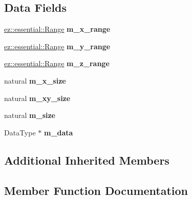 \subsection*{Data Fields}
\begin{DoxyCompactItemize}
\item 
\mbox{\label{classez_1_1objects_1_1Matrix3D_a0544904c21295ea452d0e0180db3e41f}} 
\hyperlink{classez_1_1essential_1_1Range}{ez\+::essential\+::\+Range} {\bfseries m\+\_\+x\+\_\+range}
\item 
\mbox{\label{classez_1_1objects_1_1Matrix3D_add280dfed8a17e70a78d34caea7e9cf2}} 
\hyperlink{classez_1_1essential_1_1Range}{ez\+::essential\+::\+Range} {\bfseries m\+\_\+y\+\_\+range}
\item 
\mbox{\label{classez_1_1objects_1_1Matrix3D_a06da3c5d6d3f37b7edb5958cce62f679}} 
\hyperlink{classez_1_1essential_1_1Range}{ez\+::essential\+::\+Range} {\bfseries m\+\_\+z\+\_\+range}
\item 
\mbox{\label{classez_1_1objects_1_1Matrix3D_a58ae013adbf48027f42590ecdb668b60}} 
natural {\bfseries m\+\_\+x\+\_\+size}
\item 
\mbox{\label{classez_1_1objects_1_1Matrix3D_a529b9fe5dad9cf31f0a3a2169f194247}} 
natural {\bfseries m\+\_\+xy\+\_\+size}
\item 
\mbox{\label{classez_1_1objects_1_1Matrix3D_a03de23a09ae91fcdc5b65408d280e3c9}} 
natural {\bfseries m\+\_\+size}
\item 
\mbox{\label{classez_1_1objects_1_1Matrix3D_a292ada7dbe95708f68c757cdf36a5a56}} 
Data\+Type $\ast$ {\bfseries m\+\_\+data}
\end{DoxyCompactItemize}
\subsection*{Additional Inherited Members}


\subsection{Member Function Documentation}
\mbox{\label{classez_1_1objects_1_1Matrix3D_a5e68194ecbc90039bf694377a579b59c}} 
